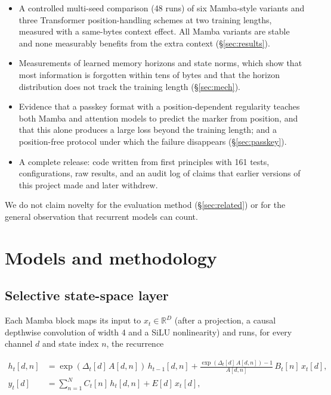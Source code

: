 \documentclass[11pt]{article}
\begin{document}
\begin{itemize}
  \item A controlled multi-seed comparison (48 runs) of six Mamba-style variants and three Transformer position-handling schemes at two training lengths, measured with a same-bytes context effect. All Mamba variants are stable and none measurably benefits from the extra context (\S\ref{sec:results}).
  \item Measurements of learned memory horizons and state norms, which show that most information is forgotten within tens of bytes and that the horizon distribution does not track the training length (\S\ref{sec:mech}).
  \item Evidence that a passkey format with a position-dependent regularity teaches both Mamba and attention models to predict the marker from position, and that this alone produces a large loss beyond the training length; and a position-free protocol under which the failure disappears (\S\ref{sec:passkey}).
  \item A complete release: code written from first principles with 161 tests, configurations, raw results, and an audit log of claims that earlier versions of this project made and later withdrew.
\end{itemize}

We do not claim novelty for the evaluation method (\S\ref{sec:related}) or for the general observation that recurrent models can count.

\section{Models and methodology}\label{sec:method}

\subsection{Selective state-space layer}\label{sec:ssm}

Each Mamba block maps its input to $x_t \in \mathbb{R}^{D}$ (after a projection, a causal depthwise convolution of width 4 and a SiLU nonlinearity) and runs, for every channel $d$ and state index $n$, the recurrence

\begin{equation}\label{eq:ssm}
\begin{aligned}
h_t[d,n] &= \exp(\Delta_t[d]\,A[d,n])\, h_{t-1}[d,n] + \frac{\exp(\Delta_t[d]\,A[d,n]) - 1}{A[d,n]}\, B_t[n]\, x_t[d], \\
y_t[d] &= \textstyle\sum_{n=1}^{N} C_t[n]\, h_t[d,n] + E[d]\, x_t[d],
\end{aligned}
\end{equation}
\end{document}
